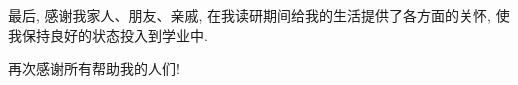 \documentclass[a4paper,12pt,openany,oneside,utf-8]{ctexbook}
\newcommand{\sanhao}{\fontsize{15.75pt}{\baselineskip}\selectfont}
\begin{document}
最后, 感谢我家人、朋友、亲戚, 在我读研期间给我的生活提供了各方面的关怀, 使我保持良好的状态投入到学业中.

再次感谢所有帮助我的人们!


%
%
%
%
%
\end{document}

